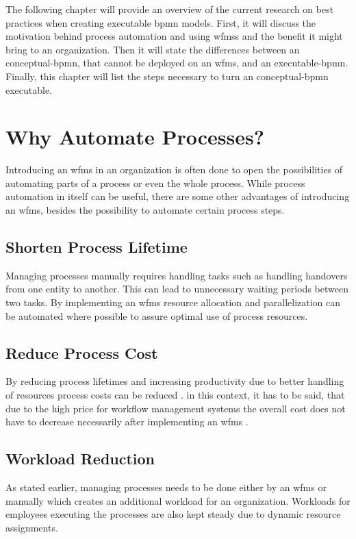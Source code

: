 \label{chapter-2}
The following chapter will provide an overview of the current research on best practices when creating executable \gls{bpmn} models. First, it will discuss the motivation behind process automation and using \gls{wfms}s and the benefit it might bring to an organization. Then it will state the differences between an \gls{conceptual-bpmn}, that cannot be deployed on an \gls{wfms}, and an \gls{executable-bpmn}. Finally, this chapter will list the steps necessary to turn an \gls{conceptual-bpmn} executable.

\section{Why Automate Processes?}
Introducing an \gls{wfms} in an organization is often done to open the possibilities of automating parts of a process or even the whole process. While process automation in itself can be useful, there are some other advantages of introducing an \gls{wfms}, besides the possibility to automate certain process steps.

\subsection{Shorten Process Lifetime}
Managing processes manually requires handling tasks such as handling handovers from one entity to another. This can lead to unnecessary waiting periods between two tasks. By implementing an \gls{wfms} resource allocation and parallelization can be automated where possible to assure optimal use of process resources. \cite{gadatsch2020grundkurs}

\subsection{Reduce Process Cost}
By reducing process lifetimes and increasing productivity due to better handling of resources process costs can be reduced \cite{gadatsch2020grundkurs}. in this context, it has to be said, that due to the high price for workflow management systems the overall cost does not have to decrease necessarily after implementing an \gls{wfms} \cite{gruber2009profitability}.

\subsection{Workload Reduction}
As stated earlier, managing processes needs to be done either by an \gls{wfms} or manually which creates an additional workload for an organization. Workloads for employees executing the processes are also kept steady due to dynamic resource assignments. \cite{fundamentals}\cite{gadatsch2020grundkurs}

